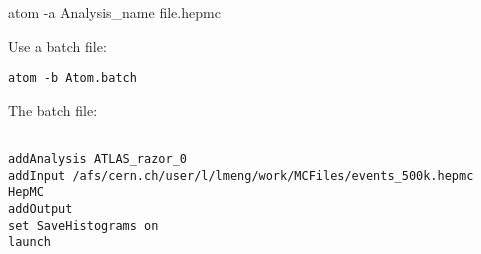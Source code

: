 atom -a Analysis_name file.hepmc



Use a batch file: 

\lstinline|atom -b Atom.batch|

The batch file:
\begin{lstlisting}

addAnalysis ATLAS_razor_0
addInput /afs/cern.ch/user/l/lmeng/work/MCFiles/events_500k.hepmc HepMC
addOutput 
set SaveHistograms on 
launch 

\end{lstlisting}